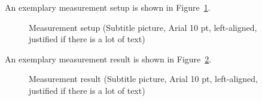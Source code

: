 An exemplary measurement setup is shown in Figure~\ref{fig:setup}.

\begin{figure}
	\centering
	\caption{Measurement setup (Subtitle picture, Arial 10 pt, left-aligned, justified if there is a lot of text)}
	\label{fig:setup}
\end{figure}

An exemplary measurement result is shown in Figure~\ref{fig:result}.

\begin{figure}
	\centering
	\caption{Measurement result (Subtitle picture, Arial 10 pt, left-aligned, justified if there is a lot of text)}
	\label{fig:result}
\end{figure}

%


